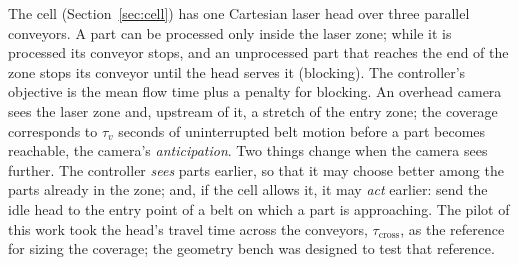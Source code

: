 \documentclass[11pt,a4paper]{article}
\newcommand{\tcross}{\tau_{\mathrm{cross}}}
\newcommand{\tv}{\tau_{v}}
\begin{document}
The cell (Section~\ref{sec:cell}) has one Cartesian laser head over three parallel
conveyors. A part can be processed only inside the laser zone; while it is processed its
conveyor stops, and an unprocessed part that reaches the end of the zone stops its
conveyor until the head serves it (blocking). The controller's objective is the mean flow
time plus a penalty for blocking. An overhead camera sees the laser zone and, upstream of
it, a stretch of the entry zone; the coverage corresponds to $\tv$ seconds of
uninterrupted belt motion before a part becomes reachable, the camera's
\emph{anticipation}. Two things change when the camera sees further. The controller
\emph{sees} parts earlier, so that it may choose better among the parts already in the
zone; and, if the cell allows it, it may \emph{act} earlier: send the idle head to the
entry point of a belt on which a part is approaching. The pilot of this work took the
head's travel time across the conveyors, $\tcross$, as the reference for sizing the
coverage; the geometry bench was designed to test that reference.
\end{document}
